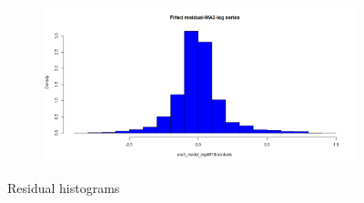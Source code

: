 \documentclass[12pt]{article}
\begin{document}
\begin{figure}[H]
\begin{subfigure}[b]{0.6\linewidth}
  \end{subfigure}
  \begin{subfigure}[b]{0.6\linewidth}
    \includegraphics[width=\linewidth]{figure11-4.png}
  \end{subfigure}
  \caption{Residual histograms}
  \label{fig:figure11}
\end{figure}
\end{document}

